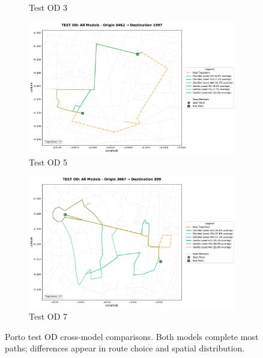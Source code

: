 \begin{figure}[H]
\begin{subfigure}{0.49\linewidth}
        \caption{Test OD 3}
    \end{subfigure}
    \begin{subfigure}{0.49\linewidth}
        \centering
        \includegraphics[width=\linewidth]{assets/plots/eval/porto/cross_model/test/test_od_comparison_5_origin5462_dest1997.pdf}
        \caption{Test OD 5}
    \end{subfigure}
    \begin{subfigure}{0.49\linewidth}
        \centering
        \includegraphics[width=\linewidth]{assets/plots/eval/porto/cross_model/test/test_od_comparison_7_origin3067_dest899.pdf}
        \caption{Test OD 7}
    \end{subfigure}
    \caption{Porto test OD cross-model comparisons. Both models complete most paths; differences appear in route choice and spatial distribution.}
    \label{fig:appendix-porto-cross-test}
\end{figure}

